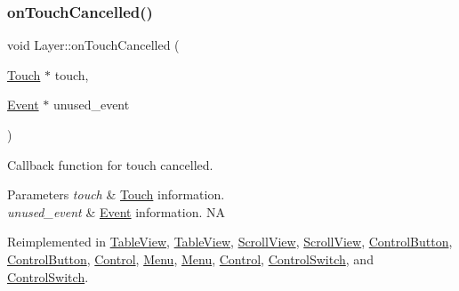 \mbox{\label{classLayer_a9254f82e75c109b81c392d415ecf7b3d}} 
\subsubsection{\texorpdfstring{on\+Touch\+Cancelled()}{onTouchCancelled()}\hspace{0.1cm}{\footnotesize\ttfamily [1/2]}}
{\footnotesize\ttfamily void Layer\+::on\+Touch\+Cancelled (\begin{DoxyParamCaption}\item[{\hyperlink{classTouch}{Touch} $\ast$}]{touch,  }\item[{\hyperlink{classEvent}{Event} $\ast$}]{unused\+\_\+event }\end{DoxyParamCaption})\hspace{0.3cm}{\ttfamily [virtual]}}

Callback function for touch cancelled.


\begin{DoxyParams}{Parameters}
{\em touch} & \hyperlink{classTouch}{Touch} information. \\
\hline
{\em unused\+\_\+event} & \hyperlink{classEvent}{Event} information.  NA \\
\hline
\end{DoxyParams}


Reimplemented in \hyperlink{classTableView_a5ed81baf58526698abefaf8ca08a6c01}{Table\+View}, \hyperlink{classTableView_a743113e92ef98837c4cfdacf40fd0a0f}{Table\+View}, \hyperlink{classScrollView_a911e0e123c9f120f654744626bfcfd2c}{Scroll\+View}, \hyperlink{classScrollView_a48d7dc926fdbd91707e37167dcf4d36f}{Scroll\+View}, \hyperlink{classControlButton_a32a7a37982d52d6660b532adabb8099e}{Control\+Button}, \hyperlink{classControlButton_a95558febae1ea6790245d093766ba20e}{Control\+Button}, \hyperlink{classControl_ab7fb8582f430d82180dbefea27c4cff9}{Control}, \hyperlink{classMenu_acb29e6ae77c5acba03ac48c5f1b6b23a}{Menu}, \hyperlink{classMenu_a19ffec24a2ec30dd290354e0e0e3aa9a}{Menu}, \hyperlink{classControl_a573efad6a6b492f4a6f4c5d06f0cdb88}{Control}, \hyperlink{classControlSwitch_a31cc47f044081bb65d8490ac1b8900c0}{Control\+Switch}, and \hyperlink{classControlSwitch_aa4c6a2f3766e9916f0619a0249ddd7d7}{Control\+Switch}.

\mbox{\label{classLayer_a47f3275e8c91e68d9a7230e44c0706ee}} 
